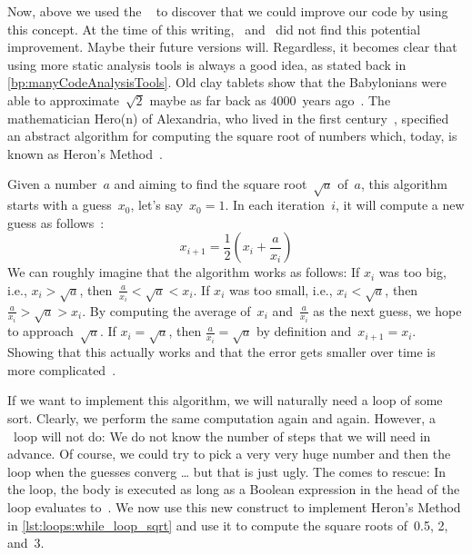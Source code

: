 Now, above we used the \pylint\  to discover that we could improve our code by using this concept.
At the time of this writing, \ruff\ and \mypy\ did not find this potential improvement.
Maybe their future versions will.
Regardless, it becomes clear that using more static analysis tools is always a good idea, as stated back in \cref{bp:manyCodeAnalysisTools}.%
%
\FloatBarrier%
\endhsection%
%
%
\label{sec:whileLoop}%
%
Old clay tablets show that the Babylonians were able to approximate~$\sqrt{2}$ maybe as far back as 4000~years ago~\cite{FR1998SRAIOBMY7IC,S2011NA:NA}.
The mathematician Hero(n) of Alexandria, who lived in the first century~, specified an abstract algorithm for computing the square root of numbers which, today, is known as Heron's Method~\cite{S2011NA:NA,K2009BMOCTSRJBOFTAOCC}.

Given a number~$a$ and aiming to find the square root~$\sqrt{a}$ of~$a$, this algorithm starts with a guess~$x_0$, let's say~$x_0=1$.
In each iteration~$i$, it will compute a new guess as follows~\cite{S2011NA:NA,K2009BMOCTSRJBOFTAOCC}:%
%
\begin{equation}%
x_{i+1}=\frac{1}{2}\left(x_i+\frac{a}{x_i}\right)%
\label{eq:heronGuessUpdate}%
\end{equation}%
%
We can roughly imagine that the algorithm works as follows:
If $x_i$ was too big, i.e., $x_i>\sqrt{a}$, then~$\frac{a}{x_i}<\sqrt{a}<x_i$.
If $x_i$ was too small, i.e., $x_i<\sqrt{a}$, then $\frac{a}{x_i}>\sqrt{a}>x_i$.
By computing the average of~$x_i$ and~$\frac{a}{x_i}$ as the next guess, we hope to approach~$\sqrt{a}$.
If $x_i=\sqrt{a}$, then $\frac{a}{x_i}=\sqrt{a}$ by definition and~$x_{i+1}=x_i$.
Showing that this actually works and that the error gets smaller over time is more complicated~\cite{S2011NA:NA}.

If we want to implement this algorithm, we will naturally need a loop of some sort.
Clearly, we perform the same computation again and again.
However, a ~loop will not do:
We do not know the number of steps that we will need in advance.
Of course, we could try to pick a very very huge number and then  the loop when the guesses converg {\dots} but that is just ugly.
The  comes to rescue:%
%
%
\FloatBarrier%
%
%
%
%
In the  loop, the body is executed as long as a Boolean expression in the head of the loop evaluates to~.
We now use this new construct to implement Heron's Method in \cref{lst:loops:while_loop_sqrt} and use it to compute the square roots of~0.5, 2, and~3.

